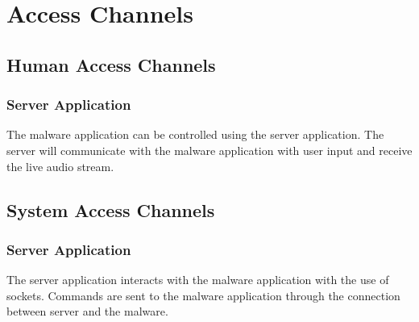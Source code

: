 \section{Access Channels}
\subsection{Human Access Channels}
    \subsubsection{Server Application}
        The malware application can be controlled using the server application. The server will communicate with the malware application with user input and receive the live audio stream.

\subsection{System Access Channels}
	\subsubsection{Server Application}
        The server application interacts with the malware application with the use of sockets. Commands are sent to the malware application through the connection between server and the malware.
